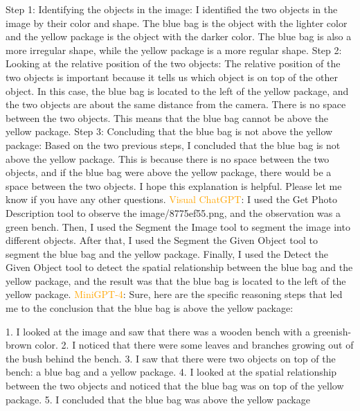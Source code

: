 \begin{enumerate}
        Step 1: Identifying the objects in the image: I identified the two objects in the image by their color and shape. The blue bag is the object with the lighter color and the yellow package is the object with the darker color. The blue bag is also a more irregular shape, while the yellow package is a more regular shape.
        Step 2: Looking at the relative position of the two objects: The relative position of the two objects is important because it tells us which object is on top of the other object. In this case, the blue bag is located to the left of the yellow package, and the two objects are about the same distance from the camera. There is no space between the two objects. This means that the blue bag cannot be above the yellow package.
        Step 3: Concluding that the blue bag is not above the yellow package: Based on the two previous steps, I concluded that the blue bag is not above the yellow package. This is because there is no space between the two objects, and if the blue bag were above the yellow package, there would be a space between the two objects.
        I hope this explanation is helpful. Please let me know if you have any other questions.
        \subitem \textcolor{orange}{Visual ChatGPT}: I used the Get Photo Description tool to observe the image/8775ef55.png, and the observation was a green bench. Then, I used the Segment the Image tool to segment the image into different objects. After that, I used the Segment the Given Object tool to segment the blue bag and the yellow package. Finally, I used the Detect the Given Object tool to detect the spatial relationship between the blue bag and the yellow package, and the result was that the blue bag is located to the left of the yellow package.
        \subitem \textcolor{orange}{MiniGPT-4}: Sure, here are the specific reasoning steps that led me to the conclusion that the blue bag is above the yellow package:

        1. I looked at the image and saw that there was a wooden bench with a greenish-brown color.
        2. I noticed that there were some leaves and branches growing out of the bush behind the bench.
        3. I saw that there were two objects on top of the bench: a blue bag and a yellow package.
        4. I looked at the spatial relationship between the two objects and noticed that the blue bag was on top of the yellow package.
        5. I concluded that the blue bag was above the yellow package
    \end{enumerate}

